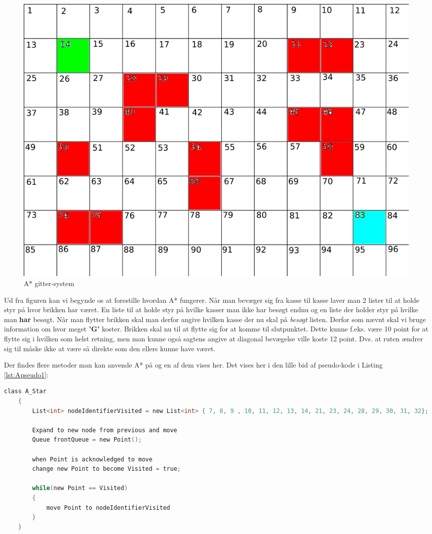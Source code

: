 \begin{figure}[ht!]
\begin{adjustbox}{width=1.2\textwidth,center=\textwidth}
\centering
\includegraphics[width=1.2\textwidth]{Pictures/Teoriafsnit/Figurfiler/Grid2.png}
\end{adjustbox}
\label{fig:AKvadrat1}
\caption{A* gitter-system}
\end{figure}

Ud fra figuren kan vi begynde os at forestille hvordan A* fungerer. Når man bevæger sig fra kasse til kasse laver man 2 lister til at holde styr på hvor brikken har været. En liste til at holde styr på hvilke kasser man ikke har besøgt endnu og en liste der holder styr på hvilke man \textbf{har} besøgt. Når man flytter brikken skal man derfor angive hvilken kasse der nu skal på \textit{besøgt} listen. Derfor som nævnt skal vi bruge information om hvor meget \textbf{'G'} koster. Brikken skal nu til at flytte sig for at komme til slutpunktet. Dette kunne f.eks. være 10 point for at flytte sig i hvilken som helst retning, men man kunne også sagtens angive at diagonal bevægelse ville koste 12 point. Dvs. at ruten ændrer sig til måske ikke at være så direkte som den ellers kunne have været.

Der findes flere metoder man kan anvende A* på og en af dem vises her.
Det vises her i den lille bid af pseudo-kode i Listing \ref{lst:Apseudo1}:
\begin{lstlisting}[caption={A stjerne og pseudo-kode af brug af lister},label={lst:Apseudo1},language=C]
	class A_Star
	{
		List<int> nodeIdentifierVisited = new List<int> { 7, 8, 9 , 10, 11, 12, 13, 14, 21, 23, 24, 28, 29, 30, 31, 32};

		Expand to new node from previous and move
		Queue frontQueue = new Point();

		when Point is acknowledged to move
		change new Point to become Visited = true;

		while(new Point == Visited)
		{
			move Point to nodeIdentifierVisited
		}
	}
\end{lstlisting}

